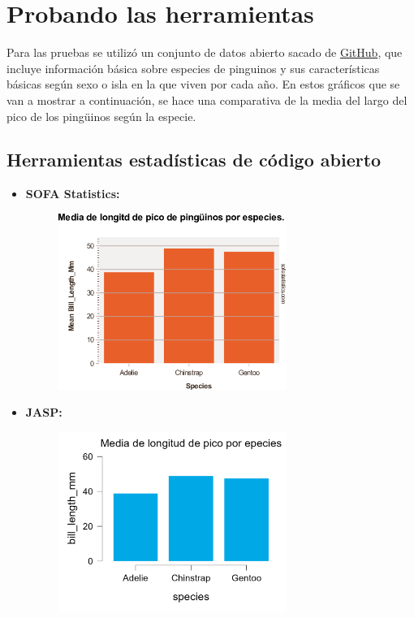\documentclass{../../miPlantilla}
\begin{document}
\begin{itemize}
\end{itemize}

\newpage

\section{Probando las herramientas}
Para las pruebas se utilizó un conjunto de datos abierto sacado de \href{https://gist.github.com/slopp/ce3b90b9168f2f921784de84fa445651}{GitHub},
que incluye información básica sobre especies de pinguinos y sus características básicas según sexo o isla en la que viven por cada año.
En estos gráficos que se van a mostrar a continuación, se hace una comparativa de la media del largo del pico de los pingüinos según la especie.

\subsection{Herramientas estadísticas de código abierto}

\begin{itemize}
    \item \textbf{SOFA Statistics:}
    \begin{figure}[H]
        \centering
        \includegraphics[width=0.7\textwidth]{1.png}
    \end{figure}

    \item \textbf{JASP:}
    \begin{figure}[H]
        \centering
        \includegraphics[width=0.7\textwidth]{2.png}
    \end{figure}
\end{itemize}
\end{document}
